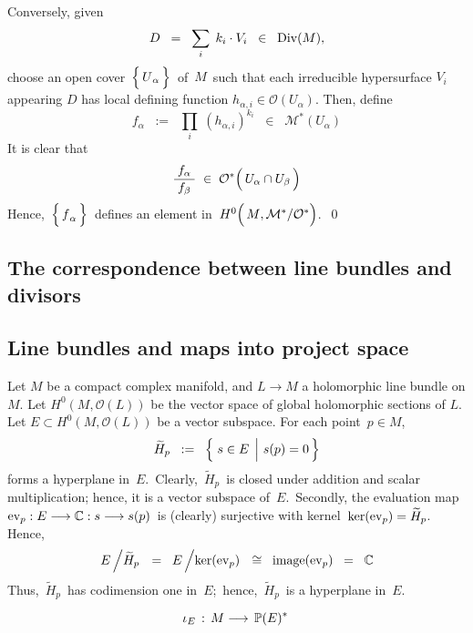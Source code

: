 Conversely, given
\begin{equation*}
D
\;\; = \;\;
	\underset{i}{\sum}\;\, k_{i} \cdot V_{i}
\;\; \in \;\;
	\Div(M),
\end{equation*}
choose an open cover \,$\left\{\,\overset{{\color{white}.}}{U}_{\alpha}\,\right\}$\,
of \,$M$\, such that each irreducible hypersurface $V_{i}$ appearing $D$
has local defining function $h_{\alpha,i} \in \mathcal{O}(U_{\alpha})$.
Then, define
\begin{equation*}
f_{\alpha}
\;\; := \;\;
	\underset{i}{\prod}\; (h_{\alpha,i})^{k_{i}}
\;\; \in \;\;
	\mathcal{M}^{*}(U_{\alpha})
\end{equation*}
It is clear that
\begin{equation*}
\dfrac{{\color{white}.}f_{\alpha}{\color{white}.}}{f_{\beta}}
\;\in\;
	\mathcal{O}^{*}\!\left(\,U_{\alpha} \overset{{\color{white}.}}{\cap} U_{\beta}\,\right)
\end{equation*}
Hence,
\,$\left\{\,\overset{{\color{white}.}}{f}_{\alpha}\,\right\}$\,
defines an element in
\,$H^{0}\!\left(\,\overset{{\color{white}.}}{M} , \mathcal{M}^{*}/\mathcal{O}^{*}\right)$.\,
\qed


\subsection{The correspondence between line bundles and divisors}


\vskip 1.0cm
\subsection{Line bundles and maps into project space}

Let $M$ be a compact complex manifold, and $L \longrightarrow M$ a holomorphic line bundle on $M$.
Let $H^{0}(M,\mathcal{O}(L))$ be the vector space of global holomorphic sections of $L$.
Let $E \subset H^{0}(M,\mathcal{O}(L))$ be a vector subspace.
For each point \,$p \in M$,
\begin{equation*}
\widetilde{H}_{p} \;\; := \;\; \left\{\,\left. s \overset{{\color{white}.}}{\in} E \,\;\right\vert\, s(p) = 0\,\right\}
\end{equation*}
forms a hyperplane in \,$E$.\,
Clearly, \,$\widetilde{H}_{p}$\, is closed under addition and scalar multiplication;
hence, it is a vector subspace of \,$E$.\,
Secondly, the evaluation map
\,$\ev_{p} : E \longrightarrow \C : s \longrightarrow s(p)$\,
is (clearly) surjective with kernel
\,$\ker(\ev_{p}) = \widetilde{H}_{p}$.\,
Hence,
\begin{equation*}
E \left/ \widetilde{H}_{p}\right.
\;\; = \;\;
	E \left/ \overset{{\color{white}.}}{\ker}(\ev_{p}) \right.
\;\; \cong \;\;
	\image(\ev_{p})
\;\; = \;\;
	\C
\end{equation*}
Thus, \,$\widetilde{H}_{p}$\, has codimension one in \,$E$;\,
hence, \,$\widetilde{H}_{p}$\, is a hyperplane in \,$E$.\,

\begin{equation*}
\iota_{E} \, : \, M \longrightarrow \, \P(E)^{*}\,
\end{equation*}

